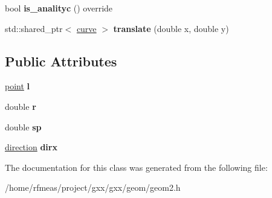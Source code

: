 \begin{DoxyCompactItemize}
\item 
bool {\bfseries is\+\_\+analityc} () override\hypertarget{classgxx_1_1geom2_1_1circle_aa81b4ec51dd1f61a9b7ef39a770257f0}{}\label{classgxx_1_1geom2_1_1circle_aa81b4ec51dd1f61a9b7ef39a770257f0}

\item 
std\+::shared\+\_\+ptr$<$ \hyperlink{classgxx_1_1geom2_1_1curve}{curve} $>$ {\bfseries translate} (double x, double y)\hypertarget{classgxx_1_1geom2_1_1circle_a03b81bb9b51fd768a581833442b57fda}{}\label{classgxx_1_1geom2_1_1circle_a03b81bb9b51fd768a581833442b57fda}

\end{DoxyCompactItemize}
\subsection*{Public Attributes}
\begin{DoxyCompactItemize}
\item 
\hyperlink{classmalgo_1_1vector2}{point} {\bfseries l}\hypertarget{classgxx_1_1geom2_1_1circle_a5f4ba09d4f8981de8a5209d0973d18f8}{}\label{classgxx_1_1geom2_1_1circle_a5f4ba09d4f8981de8a5209d0973d18f8}

\item 
double {\bfseries r}\hypertarget{classgxx_1_1geom2_1_1circle_a38247ff2ad6189df86efd599bc954898}{}\label{classgxx_1_1geom2_1_1circle_a38247ff2ad6189df86efd599bc954898}

\item 
double {\bfseries sp}\hypertarget{classgxx_1_1geom2_1_1circle_a0e1c9475ab3dc37c916ba2af119b4da8}{}\label{classgxx_1_1geom2_1_1circle_a0e1c9475ab3dc37c916ba2af119b4da8}

\item 
\hyperlink{classmalgo_1_1unit__vector2}{direction} {\bfseries dirx}\hypertarget{classgxx_1_1geom2_1_1circle_a8faa950866fa901990f179bfb4544b3f}{}\label{classgxx_1_1geom2_1_1circle_a8faa950866fa901990f179bfb4544b3f}

\end{DoxyCompactItemize}


The documentation for this class was generated from the following file\+:\begin{DoxyCompactItemize}
\item 
/home/rfmeas/project/gxx/gxx/geom/geom2.\+h\end{DoxyCompactItemize}
